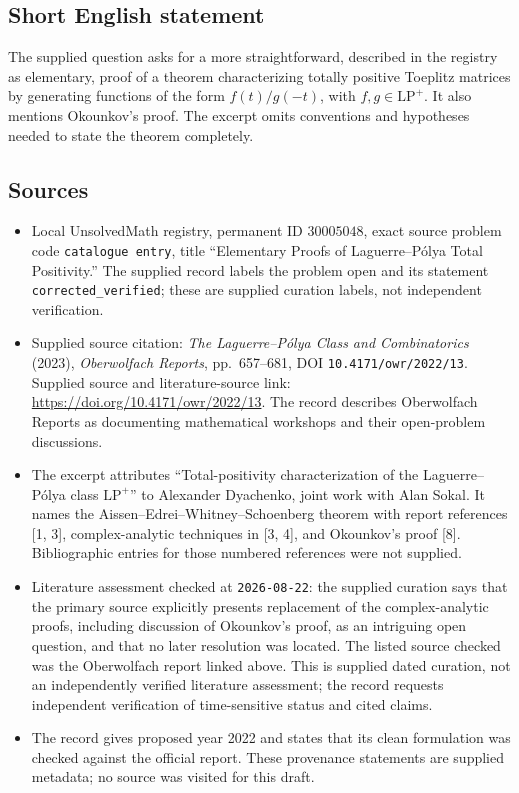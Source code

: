 \documentclass[11pt]{article}
\begin{document}
\subsection{Short English statement}
The supplied question asks for a more straightforward, described in the registry as elementary, proof of a theorem characterizing totally positive Toeplitz matrices by generating functions of the form \(f(t)/g(-t)\), with \(f,g\in\mathrm{LP}^{+}\). It also mentions Okounkov's proof. The excerpt omits conventions and hypotheses needed to state the theorem completely.
\subsection{Sources}
\begin{itemize}
\item Local UnsolvedMath registry, permanent ID \(30005048\), exact source problem code \texttt{catalogue entry}, title ``Elementary Proofs of Laguerre--P\'olya Total Positivity.'' The supplied record labels the problem open and its statement \texttt{corrected\_verified}; these are supplied curation labels, not independent verification.
\item Supplied source citation: \emph{The Laguerre--P\'olya Class and Combinatorics} (2023), \emph{Oberwolfach Reports}, pp.\ 657--681, DOI \texttt{10.4171/owr/2022/13}. Supplied source and literature-source link: \url{https://doi.org/10.4171/owr/2022/13}. The record describes Oberwolfach Reports as documenting mathematical workshops and their open-problem discussions.
\item The excerpt attributes ``Total-positivity characterization of the Laguerre--P\'olya class \(\mathrm{LP}^{+}\)'' to Alexander Dyachenko, joint work with Alan Sokal. It names the Aissen--Edrei--Whitney--Schoenberg theorem with report references [1, 3], complex-analytic techniques in [3, 4], and Okounkov's proof [8]. Bibliographic entries for those numbered references were not supplied.
\item Literature assessment checked at \texttt{2026-08-22}: the supplied curation says that the primary source explicitly presents replacement of the complex-analytic proofs, including discussion of Okounkov's proof, as an intriguing open question, and that no later resolution was located. The listed source checked was the Oberwolfach report linked above. This is supplied dated curation, not an independently verified literature assessment; the record requests independent verification of time-sensitive status and cited claims.
\item The record gives proposed year 2022 and states that its clean formulation was checked against the official report. These provenance statements are supplied metadata; no source was visited for this draft.
\end{itemize}
\end{document}

